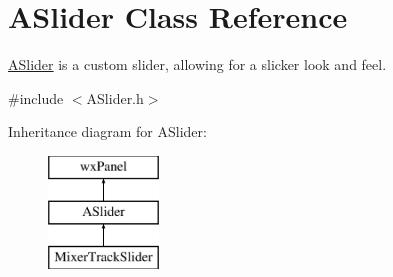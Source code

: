\hypertarget{class_a_slider}{}\section{A\+Slider Class Reference}
\label{class_a_slider}


\hyperlink{class_a_slider}{A\+Slider} is a custom slider, allowing for a slicker look and feel.  




{\ttfamily \#include $<$A\+Slider.\+h$>$}

Inheritance diagram for A\+Slider\+:\begin{figure}[H]
\begin{center}
\leavevmode
\includegraphics[height=3.000000cm]{class_a_slider}
\end{center}
\end{figure}
